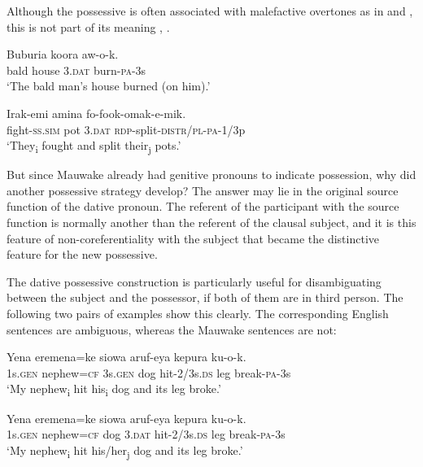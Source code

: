 Although the possessive is often associated with malefactive overtones as in  and , this is not part of its meaning , . 

\ea%
\label{ex:3:x1787}
\gll Buburia koora  aw-o-k. \\
bald house 3.\textsc{dat} burn-\textsc{pa}-3s \\
\glt`The bald man's house burned (on him).'
\z

\ea%
\label{ex:3:x1792}
\gll Irak-emi amina  fo-fook-omak-e-mik. \\
fight-\textsc{ss}.\textsc{sim} pot 3.\textsc{dat} \textsc{rdp}-split-\textsc{distr}/\textsc{pl}-\textsc{pa}-1/3p\\
\glt`They\textsubscript{i} fought and split their\textsubscript{j} pots.'
\z

But since Mauwake already had genitive pronouns to indicate possession, why did another possessive strategy develop? The answer may lie in the original source function of the dative pronoun. The referent of the participant with the source function is normally another than the referent of the clausal subject, and it is this feature of non-coreferentiality with the subject that became the distinctive feature for the new possessive. 

The dative possessive construction is particularly useful for disambiguating between the subject and the possessor, if both of them are in third person. The following two pairs of examples show this clearly. The corresponding English sentences are ambiguous, whereas the Mauwake sentences are not: 

\ea%
\label{ex:3:x1797}
\gll Yena eremena=ke   siowa aruf-eya kepura ku-o-k. \\
1s.\textsc{gen} nephew=\textsc{cf} 3s.\textsc{gen} dog hit-2/3s.\textsc{ds} leg break-\textsc{pa}-3s\\
\glt`My nephew\textsubscript{i} hit his\textsubscript{i} dog and its leg broke.'
\z

\ea%
\label{ex:3:x1796}
\gll Yena eremena=ke siowa  aruf-eya kepura ku-o-k. \\
1s.\textsc{gen} nephew=\textsc{cf} dog 3.\textsc{dat} hit-2/3s.\textsc{ds} leg break-\textsc{pa}-3s\\
\glt`My nephew\textsubscript{i} hit his/her\textsubscript{j} dog and its leg broke.'
\z


